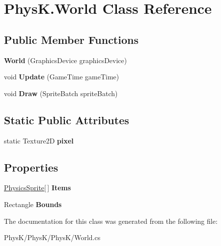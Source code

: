 \hypertarget{class_phys_k_1_1_world}{}\section{Phys\+K.\+World Class Reference}
\label{class_phys_k_1_1_world}
\subsection*{Public Member Functions}
\begin{DoxyCompactItemize}
\item 
{\bfseries World} (Graphics\+Device graphics\+Device)\hypertarget{class_phys_k_1_1_world_a32c4a8c2c6f055987352729f5d3d8945}{}\label{class_phys_k_1_1_world_a32c4a8c2c6f055987352729f5d3d8945}

\item 
void {\bfseries Update} (Game\+Time game\+Time)\hypertarget{class_phys_k_1_1_world_a92cae5266d900ee840afbd8fd421e1ca}{}\label{class_phys_k_1_1_world_a92cae5266d900ee840afbd8fd421e1ca}

\item 
void {\bfseries Draw} (Sprite\+Batch sprite\+Batch)\hypertarget{class_phys_k_1_1_world_a62ca116b56748ed477b5c37ffcf5d37b}{}\label{class_phys_k_1_1_world_a62ca116b56748ed477b5c37ffcf5d37b}

\end{DoxyCompactItemize}
\subsection*{Static Public Attributes}
\begin{DoxyCompactItemize}
\item 
static Texture2D {\bfseries pixel}\hypertarget{class_phys_k_1_1_world_a5ac853e0538bde0bad91879721fbbf54}{}\label{class_phys_k_1_1_world_a5ac853e0538bde0bad91879721fbbf54}

\end{DoxyCompactItemize}
\subsection*{Properties}
\begin{DoxyCompactItemize}
\item 
\hyperlink{class_phys_k_1_1_physics_sprite}{Physics\+Sprite}\mbox{[}$\,$\mbox{]} {\bfseries Items}\hypertarget{class_phys_k_1_1_world_a04e7b4abd4acc5081b12628509a68eff}{}\label{class_phys_k_1_1_world_a04e7b4abd4acc5081b12628509a68eff}

\item 
Rectangle {\bfseries Bounds}\hypertarget{class_phys_k_1_1_world_ac6f8018610492ff8b2e949bfd9204a95}{}\label{class_phys_k_1_1_world_ac6f8018610492ff8b2e949bfd9204a95}

\end{DoxyCompactItemize}


The documentation for this class was generated from the following file\+:\begin{DoxyCompactItemize}
\item 
Phys\+K/\+Phys\+K/\+Phys\+K/World.\+cs\end{DoxyCompactItemize}
